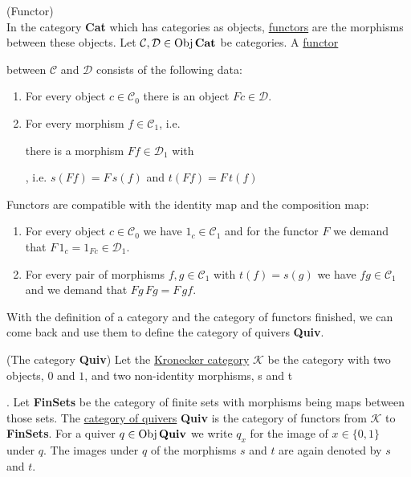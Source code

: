 \begin{definition}{(Functor)}\\
In the category \textbf{Cat} which has categories as objects, \ul{functors} are the morphisms between these objects.
Let $\mathcal{C},\mathcal{D} \in \textup{Obj}\,\textbf{Cat}$ be categories. A \ul{functor}  between $\mathcal{C}$ and $\mathcal{D}$ consists
of the following data:
\renewcommand{\labelenumi}{(\theenumi)}
\begin{enumerate}
\item For every object $c \in \mathcal{C}_{0}$ there is an object $Fc \in \mathcal{D}$.
\item For every morphism $f \in \mathcal{C}_{1}$, i.e.  there is a morphism
$Ff \in \mathcal{D}_{1}$ with , i.e. $s(Ff) = F\,s(f)$ and $t(Ff) = F\,t(f)$
\setcounter{saveenum}{\value{enumi}}
\end{enumerate}
Functors are compatible with the identity map and the composition map:
\begin{enumerate}
\setcounter{enumi}{\value{saveenum}}
\item For every object $c \in \mathcal{C}_{0}$ we have $1_{c} \in \mathcal{C}_{1}$ and for the functor $F$ we demand that
$F\,1_{c} = 1_{Fc} \in \mathcal{D}_{1}$. 
\item For every pair of morphisms $f,g \in \mathcal{C}_{1}$ with $t(f) = s(g)$ we have $fg \in \mathcal{C}_{1}$ and we demand that
$Fg\,Fg = F\,gf$.
\end{enumerate}
\end{definition}

With the definition of a category and the category of functors finished, we can come back and use them to define the category of quivers
\textbf{Quiv}.

\begin{definition}{(The category \textbf{Quiv})}\cite{[4681]}
Let the \ul{Kronecker category} $\mathcal{K}$ be the category with two objects, $0$ and $1$, and two non-identity morphisms, s and t
.
Let \textbf{FinSets} be the category of finite sets with morphisms being maps between those sets.
The \ul{category of quivers} \textbf{Quiv} is the category of functors from $\mathcal{K}$ to \textbf{FinSets}.
For a quiver $q \in \textup{Obj}\,\textbf{Quiv}$ we write $q_{x}$ for the image of $x \in \{0,1\}$ under $q$.
The images under $q$ of the morphisms $s$ and $t$ are again denoted by $s$ and $t$.
\end{definition}


